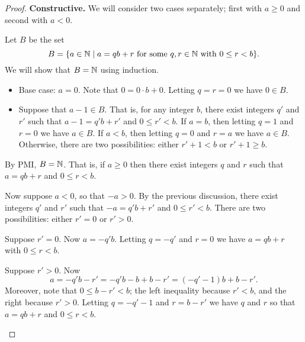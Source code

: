 \begin{proof}
\textbf{Constructive.} We will consider two cases separately; first with \(a \geq 0\) and second with \(a < 0\).

\begin{inlineproplist}
\item Let \(B\) be the set \[ B = \{ a \in \mathbb{N} \mid a = qb + r\ \mathrm{for\ some}\ q,r \in \mathbb{N}\ \mathrm{with}\ 0 \leq r < b \}. \]
We will show that \(B = \mathbb{N}\) using induction.
\begin{itemize}
\item Base case: \(a = 0\).
Note that \(0 = 0 \cdot b + 0\).
Letting \(q = r = 0\) we have \(0 \in B\).
\item Suppose that \(a-1 \in B\).
That is, for any integer \(b\), there exist integers \(q'\) and \(r'\) such that \(a-1 = q'b + r'\) and \(0 \leq r' < b\).
If \(a = b\), then letting \(q = 1\) and \(r = 0\) we have \(a \in B\).
If \(a < b\), then letting \(q = 0\) and \(r = a\) we have \(a \in B\).
Otherwise, there are two possibilities: either \(r'+1 < b\) or \(r'+1 \geq b\).
%
\end{itemize}%
By PMI, \(B = \mathbb{N}\).
That is, if \(a \geq 0\) then there exist integers \(q\) and \(r\) such that \(a = qb + r\) and \(0 \leq r < b\).

\item Now suppose \(a < 0\), so that \(-a > 0\).
By the previous discussion, there exist integers \(q'\) and \(r'\) such that \(-a = q'b + r'\) and \(0 \leq r' < b\).
There are two possibilities: either \(r' = 0\) or \(r' > 0\).
\begin{inlinecaselist}
\item  Suppose \(r' = 0\).
Now \(a = -q'b\).
Letting \(q = -q'\) and \(r = 0\) we have \(a = qb+r\) with \(0 \leq r < b\).
\item  Suppose \(r' > 0\).
Now \[ a = -q'b - r' = -q'b - b + b - r' = (-q'-1)b + b-r'. \]
Moreover, note that \(0 \leq b-r' < b\); the left inequality because \(r' < b\), and the right because \(r' > 0\).
Letting \(q = -q'-1\) and \(r = b-r'\) we have \(q\) and \(r\) so that \(a = qb+r\) and \(0 \leq r < b\).
\end{inlinecaselist}
\end{inlineproplist}
\end{proof}

